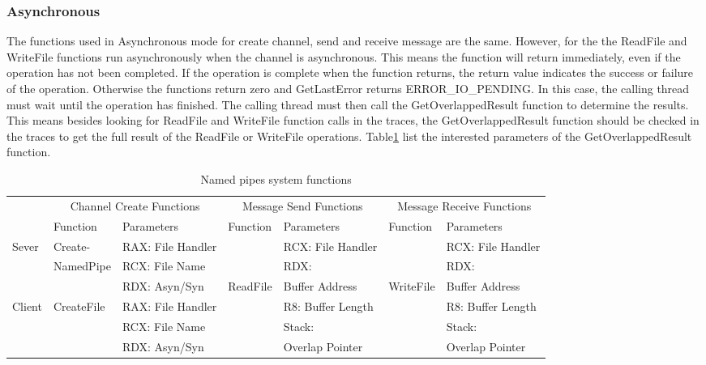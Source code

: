 \documentclass[paper=a4, fontsize=11pt]{scrartcl}
\numberwithin{equation}{section}		%
\numberwithin{figure}{section}			%
\numberwithin{table}{section}				%
\begin{document}
\subsubsection{Asynchronous}
The functions used in Asynchronous mode for create channel, send and receive message are the same. However, for the the ReadFile and WriteFile functions run asynchronously when the channel is asynchronous. This means the function will return immediately, even if the operation has not been completed. If the operation is complete when the function returns, the return value indicates the success or failure of the operation. Otherwise the functions return zero and GetLastError returns ERROR_IO_PENDING. In this case, the calling thread must wait until the operation has finished. The calling thread must then call the GetOverlappedResult function to determine the results. This means besides looking for ReadFile and WriteFile function calls in the traces, the GetOverlappedResult function should be checked in the traces to get the full result of the ReadFile or WriteFile operations. Table\ref{asynfunctions} list the interested parameters of the GetOverlappedResult function.
\begin{table}[h]
        \centering
        \caption{Named pipes system functions}
        \label{asynfunctions}
        \begin{tabular}{|l|l|l|l|l|l|l|}
            \hline
             \multirow{2}{*}{} &
               \multicolumn{2}{c|}{Channel Create Functions} &
               \multicolumn{2}{c|}{Message Send Functions} &
               \multicolumn{2}{c|}{Message Receive Functions} \\
             \cline{2-7}
              & Function& Parameters & Function & Parameters  & Function & Parameters\\
             \hline
             Sever& Create-&  RAX: File Handler &  &  RCX: File Handler &&RCX: File Handler\\
             \cline{3-3} \cline{5-5} \cline{7-7}
             &NamedPipe&RCX: File Name && RDX:  &&RDX: \\
              \cline{3-3} 
             &&RDX: Asyn/Syn&ReadFile& Buffer Address &WriteFile&Buffer Address\\
                \cline{1-3} \cline{5-5} \cline{7-7}
             Client & CreateFile & RAX: File Handler & &  R8: Buffer Length &&R8: Buffer Length\\
              \cline{3-3} \cline{5-5} \cline{7-7}
             &&RCX: File Name &&Stack:&&Stack:\\
             \cline{3-3} 
             &&RDX: Asyn/Syn&& Overlap Pointer&&Overlap Pointer\\
            \hline
        \end{tabular}
    \end{table}
\end{document}
